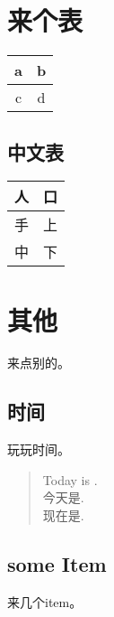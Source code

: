 \documentclass{scrartcl}
\begin{document}
\begin{CJK}{UTF8}{gbsn}
\clearpage

\section{来个表}

\begin{tabular}{|c|c|}
	\hline
	a & b\\
	\hline
	c & d\\
	\hline
\end{tabular}

\subsection{中文表}
\begin{tabular}{|c|c|}
	\hline
	人 & 口\\
	\hline
	手 & 上\\
	\hline
	中 & 下\\
	\hline
\end{tabular}

\section{其他}
来点别的。

\subsection{时间}
玩玩时间。\\

\begin{minipage}[h]{0.4\linewidth}
\begin{flushleft}

\begin{verse}
Today is \todaysname. \\
今天是\todaysname. \\
现在是\thistime. \\
\end{verse}


\subsection{some Item}
来几个item。


\end{flushleft}
\end{minipage}
\end{CJK}
\end{document}
